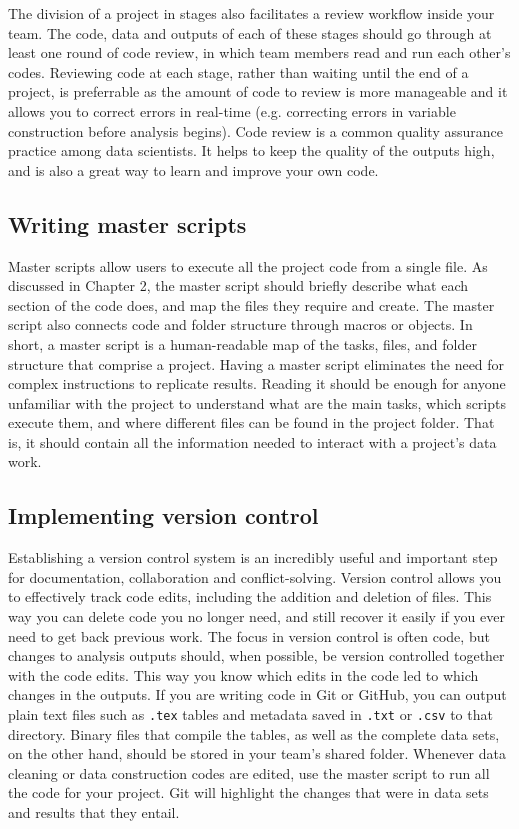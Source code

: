 The division of a project in stages also facilitates a review workflow inside your team.
The code, data and outputs of each of these stages should go through at least one round of code review,
in which team members read and run each other's codes.
Reviewing code at each stage, rather than waiting until the end of a project,
is preferrable as the amount of code to review is more manageable and
it allows you to correct errors in real-time (e.g. correcting errors in variable construction before analysis begins).
Code review is a common quality assurance practice among data scientists.
It helps to keep the quality of the outputs high, and is also a great way to learn and improve your own code.

\subsection{Writing master scripts}

Master scripts allow users to execute all the project code from a single file.
As discussed in Chapter 2, the master script should briefly describe what each
section of the code does, and map the files they require and create.
The master script also connects code and folder structure through macros or objects.
In short, a master script is a human-readable map of the tasks,
files, and folder structure that comprise a project.
Having a master script eliminates the need for complex instructions to replicate results.
Reading it should be enough for anyone unfamiliar with the project
to understand what are the main tasks, which scripts execute them,
and where different files can be found in the project folder.
That is, it should contain all the information needed to interact with a project's data work.

\subsection{Implementing version control}

Establishing a version control system is an incredibly useful
and important step for documentation, collaboration and conflict-solving.
Version control allows you to effectively track code edits,
including the addition and deletion of files.
This way you can delete code you no longer need,
and still recover it easily if you ever need to get back previous work.
The focus in version control is often code, but changes to analysis outputs should, when possible, be version controlled together with the code edits.
This way you know which edits in the code led to which changes in the outputs.
If you are writing code in Git or GitHub,
you can output plain text files such as \texttt{.tex} tables
and metadata saved in \texttt{.txt} or \texttt{.csv} to that directory.
Binary files that compile the tables,
as well as the complete data sets, on the other hand,
should be stored in your team's shared folder.
Whenever data cleaning or data construction codes are edited,
use the master script to run all the code for your project.
Git will highlight the changes that were in data sets and results that they entail.


